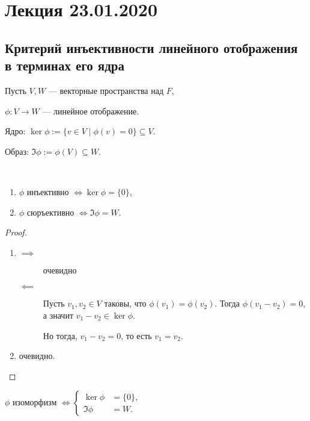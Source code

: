 \section{Лекция 23.01.2020}

\subsection{Критерий инъективности линейного отображения в терминах его ядра}

Пусть $V, W$ --- векторные пространства над $F$, 

$\phi : V \to W$ --- линейное отображение.

Ядро: $\ker \phi := \{v \in V \mid \phi(v) = 0\} \subseteq V$.

Образ: $\Im \phi := \phi(V) \subseteq W$.

\begin{proposal}~
    \begin{enumerate}[label=(\alph*)]
    \item $\phi$ инъективно $\iff \ker \phi = \{0\}$,
    \item $\phi$ сюръективно $\iff \Im \phi = W$.
    \end{enumerate}
\end{proposal}

\begin{proof}~
    \begin{enumerate}[label=(\alph*)]
    \item 
        \begin{description}
        \item[$\implies$] очевидно
        \item[$\impliedby$] 
            Пусть $v_1, v_2 \in V$ таковы, что $\phi(v_1) = \phi(v_2)$. 
            Тогда $\phi(v_1 - v_2) = 0$, а значит $v_1 - v_2 \in \ker \phi$.

            Но тогда, $v_1 - v_2 = 0$, то есть $v_1 = v_2$.
        \end{description}
    \item очевидно.
        \qedhere
    \end{enumerate}
\end{proof}

\begin{corollary}
    $\phi$ изоморфизм
    \begin{math}
        \iff
        \left\{
        \begin{aligned}
            \ker \phi &= \{0\},\\
            \Im \phi &= W.
        \end{aligned}
        \right.
    \end{math}
\end{corollary}


